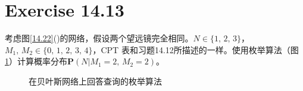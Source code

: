 \documentclass{article}
\begin{document}
\section{Exercise 14.13}
考虑图\ref{14.22}()的网络，假设两个望远镜完全相同。$N \in \{1,\, 2,\, 3\}$，$M_1,\, M_2 \in \{0,\, 1,\, 2,\, 3,\, 4\}$，CPT 表和习题14.12所描述的一样。使用枚举算法（图\ref{14.9}）计算概率分布$\mathbf{P}(N | M_1 = 2,\, M_2 = 2)$。
\begin{figure}
    \centering
    \caption{在贝叶斯网络上回答查询的枚举算法}
    \label{14.9}
\end{figure}
\end{document}
